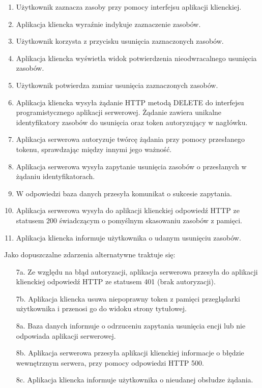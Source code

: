 \begin{enumerate}
    \item Użytkownik zaznacza zasoby przy pomocy interfejsu aplikacji klienckiej.
    \item Aplikacja kliencka wyraźnie indykuje zaznaczenie zasobów.
    \item Użytkownik korzysta z przycisku usunięcia zaznaczonych zasobów.
    \item Aplikacja kliencka wyświetla widok potwierdzenia nieodwracalnego usunięcia zasobów.
    \item Użytkownik potwierdza zamiar usunięcia zaznaczonych zasobów.
    \item Aplikacja kliencka wysyła żądanie HTTP metodą DELETE do interfejsu programistycznego aplikacji serwerowej. Żądanie zawiera unikalne identyfikatory zasobów do usunięcia oraz token autoryzujący w nagłówku.
    \item Aplikacja serwerowa autoryzuje twórcę żądania przy pomocy przesłanego tokenu, sprawdzając między innymi jego ważność.
    \item Aplikacja serwerowa wysyła zapytanie usunięcia zasobów o przesłanych w żądaniu identyfikatorach.
    \item W odpowiedzi baza danych przesyła komunikat o sukcesie zapytania.
    \item Aplikacja serwerowa wysyła do aplikacji klienckiej odpowiedź HTTP ze statusem 200 świadczącym o pomyślnym skasowaniu zasobów z pamięci.
    \item Aplikacja kliencka informuje użytkownika o udanym usunięciu zasobów.
\end{enumerate}

Jako dopuszczalne zdarzenia alternatywne traktuje się:

\begin{enumerate}
    \item [7a.] Ze względu na błąd autoryzacji, aplikacja serwerowa przesyła do aplikacji klienckiej odpowiedź HTTP ze statusem 401 (brak autoryzacji).
    \item [7b.] Aplikacja kliencka usuwa niepoprawny token z pamięci przeglądarki użytkownika i przenosi go do widoku strony tytułowej.
    \item [8a.] Baza danych informuje o odrzuceniu zapytania usunięcia encji lub nie odpowiada aplikacji serwerowej. 
    \item [8b.] Aplikacja serwerowa przesyła aplikacji klienckiej informacje o błędzie wewnętrznym serwera, przy pomocy odpowiedzi HTTP 500. 
    \item [8c.] Aplikacja kliencka informuje użytkownika o nieudanej obsłudze żądania.
\end{enumerate}